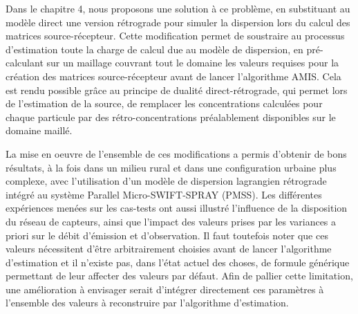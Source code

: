 Dans le chapitre 4, nous proposons une solution à ce problème, en substituant au modèle direct une version rétrograde pour simuler la dispersion lors du calcul des matrices source-récepteur. Cette modification permet de soustraire au processus d'estimation toute la charge de calcul due au modèle de dispersion, en pré-calculant sur un maillage couvrant tout le domaine les valeurs requises pour la création des matrices source-récepteur avant de lancer l'algorithme AMIS. Cela est rendu possible grâce au principe de dualité direct-rétrograde, qui permet lors de l'estimation de la source, de remplacer les concentrations calculées pour chaque particule par des rétro-concentrations préalablement disponibles sur le domaine maillé. 




La mise en oeuvre de l'ensemble de ces modifications a permis d'obtenir de bons résultats, à la fois dans un milieu rural et dans une configuration urbaine plus complexe, avec l'utilisation d'un modèle de dispersion lagrangien rétrograde intégré au système Parallel Micro-SWIFT-SPRAY (PMSS).  Les différentes expériences menées sur les cas-tests ont aussi illustré l'influence de la disposition du réseau de capteurs, ainsi que l'impact des valeurs prises par les variances a priori sur le débit d'émission et d'observation. Il faut toutefois noter que ces valeurs nécessitent d'être arbitrairement choisies avant de lancer l'algorithme d'estimation et il n'existe pas, dans l'état actuel des choses, de formule générique permettant de leur affecter des valeurs par défaut. Afin de pallier cette limitation, une amélioration à envisager serait d'intégrer directement ces paramètres à l'ensemble des valeurs à reconstruire par l'algorithme d'estimation.

